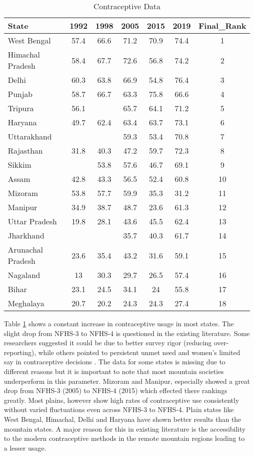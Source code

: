 \begin{table}[h!]
\centering
\caption{Contraceptive Data}
\begin{tabular}{lcccccc}
\toprule
State & 1992 & 1998 & 2005 & 2015 & 2019 & Final\_Rank \\
\midrule
West Bengal & 57.4 & 66.6 & 71.2 & 70.9 & 74.4 & 1 \\
Himachal Pradesh & 58.4 & 67.7 & 72.6 & 56.8 & 74.2 & 2 \\
Delhi & 60.3 & 63.8 & 66.9 & 54.8 & 76.4 & 3 \\
Punjab & 58.7 & 66.7 & 63.3 & 75.8 & 66.6 & 4 \\
Tripura & 56.1 &  & 65.7 & 64.1 & 71.2 & 5 \\
Haryana & 49.7 & 62.4 & 63.4 & 63.7 & 73.1 & 6 \\
Uttarakhand &  &  & 59.3 & 53.4 & 70.8 & 7 \\
Rajasthan & 31.8 & 40.3 & 47.2 & 59.7 & 72.3 & 8 \\
Sikkim &  & 53.8 & 57.6 & 46.7 & 69.1 & 9 \\
Assam & 42.8 & 43.3 & 56.5 & 52.4 & 60.8 & 10 \\
Mizoram & 53.8 & 57.7 & 59.9 & 35.3 & 31.2 & 11 \\
Manipur & 34.9 & 38.7 & 48.7 & 23.6 & 61.3 & 12 \\
Uttar Pradesh & 19.8 & 28.1 & 43.6 & 45.5 & 62.4 & 13 \\
Jharkhand &  &  & 35.7 & 40.3 & 61.7 & 14 \\
Arunachal Pradesh & 23.6 & 35.4 & 43.2 & 31.6 & 59.1 & 15 \\
Nagaland & 13 & 30.3 & 29.7 & 26.5 & 57.4 & 16 \\
Bihar & 23.1 & 24.5 & 34.1 & 24 & 55.8 & 17 \\
Meghalaya & 20.7 & 20.2 & 24.3 & 24.3 & 27.4 & 18 \\
\bottomrule
\end{tabular}
\label{tab:contraceptive_data}
\end{table}
Table \ref{tab:contraceptive_data} shows a constant increase in contraceptive usage in most states. The slight drop from NFHS-3 to NFHS-4 is questioned in the existing literature. Some researchers suggested it could be due to better survey rigor (reducing over-reporting), while others pointed to persistent unmet need and women’s limited say in contraceptive decisions \citep{kumar2022measuring}. The data for some states is missing due to different reasons but it is important to note that most mountain societies underperform in this parameter. Mizoram and Manipur, especially showed a great drop from NFHS-3 (2005) to NFHS-4 (2015) which effected there rankings greatly. Most plains, however show high rates of contraceptive use consistently without varied fluctuations even across NFHS-3 to NFHS-4. Plain states like West Bengal, Himachal, Delhi and Haryana have shown better results than the mountain states. A major reason for this in existing literature is  the accessibility to the modern contraceptive methods in the remote mountain regions leading to a lesser usage. 

